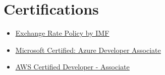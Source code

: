 \documentclass[a4paper,11pt]{article}
\newcommand{\resumeItem}[1]{
  \item\small{#1}
}
\newcommand{\resumeItemListStart}{\begin{itemize}[rightmargin=0.11in]}
\newcommand{\resumeItemListEnd}{\end{itemize}}
\begin{document}







\section{Certifications}
  \resumeItemListStart{}
    \resumeItem{\href{https://dummy-certification.com}{\uline{Exchange Rate Policy by IMF}}}
    \resumeItem{\href{https://dummy-certification.com}{\uline{Microsoft Certified: Azure Developer Associate}}}
    \resumeItem{\href{https://dummy-certification.com}{\uline{AWS Certified Developer - Associate}}}
  \resumeItemListEnd{}
\end{document}
